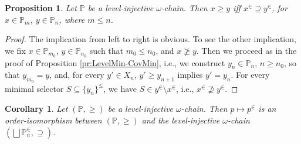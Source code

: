 \documentclass[12pt]{amsart}
\theoremstyle{plain}
\newtheorem{corollary}[theorem]{\bf Corollary}
\newtheorem{remark}[theorem]{\bf Remark}
\newtheorem{proposition}[theorem]{\bf Proposition}
\newcommand \PPb{\mathbb{P}}
\begin{document}



%	
\begin{proposition}
\label{le:GoodBehavior}
Let  $\PPb$ be a level-injective $\omega$-chain. Then $x \geq y$ iff $x^\in \supseteq y^\in$, for $x \in \PPb_m$, $y \in \PPb_n$, where $m \leq n$. %
\end{proposition}

\begin{proof}
	The implication from left to right is obvious. To see the other implication, we fix $x \in \PPb_{m_0}$, $y \in \PPb_{n_0}$ such that $m_0 \leq n_0$, and $x \not \geq y$. Then we proceed as in the proof of Proposition \ref{pr:LevelMin-CovMin}, i.e., we construct $y_n	\in \PPb_{n}$, $n \geq n_0$, so that $y_{m_0}=y$, and, for every $y' \in X_{n}$, $y' \geq y_{n+1}$ implies $y'=y_n$. For every minimal selector $S \subseteq \{y_n\}^\leq$, we have $S \in y^\in \setminus x^\in$, i.e., $x^\in \not \supseteq y^\in$.
\end{proof}

\begin{corollary}
\label{co:IsomorphicPosets}	
Let $(\PPb, \geq)$ be a  level-injective $\omega$-chain. Then $p \mapsto p^\in$ is an order-isomorphism between $(\PPb, \geq)$ and the level-injective $\omega$-chain  $(\bigsqcup \PPb_n^\in, \supseteq)$.
\end{corollary} 

	
	
	
	
\end{document}
